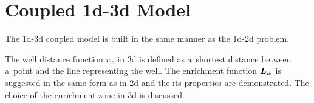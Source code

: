 \section{Coupled 1d-3d Model}
\label{sec:coupled_13d}
The 1d-3d coupled model is built in the same manner as the 1d-2d problem.



The well distance function $r_w$ in 3d is defined as a~shortest distance
between a~point and the line representing the well.
The enrichment function $\mathbf{\boldsymbol{L}}_{w}$  is suggested in the same form as in 2d 
and the its properties are demonstrated.
The choice of the enrichment zone in 3d is discussed.

